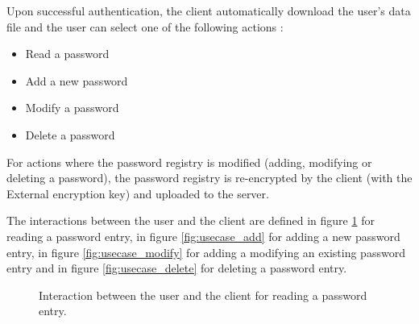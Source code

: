 \documentclass[../report.tex]{subfiles}
\begin{document}
Upon successful authentication, the client automatically download the user's data file and the user can select one of the following actions :

\begin{itemize}
 \item Read a password
 \item Add a new password
 \item Modify a password
 \item Delete a password
\end{itemize}

For actions where the password registry is modified (adding, modifying or deleting a password), the password registry is re-encrypted by the client (with the External encryption key) and uploaded to the server.


The interactions between the user and the client are defined in figure \ref{fig:usecase_read} for reading a password entry, in figure \ref{fig:usecase_add} for adding a new password entry, in figure \ref{fig:usecase_modify} for adding a modifying an existing password entry and in figure \ref{fig:usecase_delete} for deleting a password entry.






\begin{figure}[h]
 \centering

 \setlength{\fboxsep}{10pt}
 \setlength{\fboxrule}{1pt}

 \caption{Interaction between the user and the client for reading a password entry.}
 \label{fig:usecase_read}
\end{figure}
\end{document}
